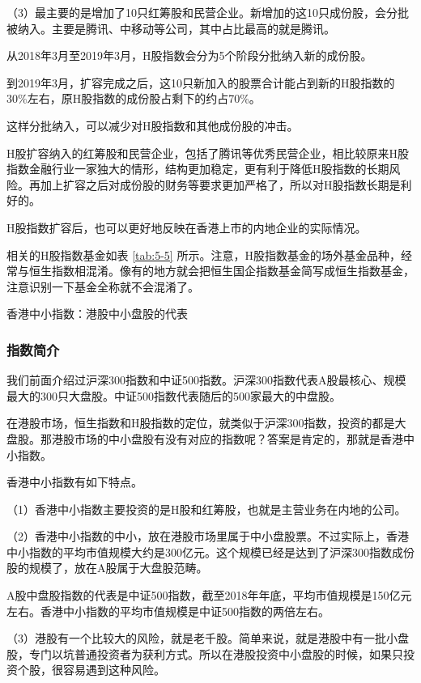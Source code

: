 （3）最主要的是增加了10只红筹股和民营企业。新增加的这10只成份股，会分批被纳入。主要是腾讯、中移动等公司，其中占比最高的就是腾讯。

从2018年3月至2019年3月，H股指数会分为5个阶段分批纳入新的成份股。

到2019年3月，扩容完成之后，这10只新加入的股票合计能占到新的H股指数的30\%左右，原H股指数的成份股占剩下的约占70\%。

这样分批纳入，可以减少对H股指数和其他成份股的冲击。

H股扩容纳入的红筹股和民营企业，包括了腾讯等优秀民营企业，相比较原来H股指数金融行业一家独大的情形，结构更加稳定，更有利于降低H股指数的长期风险。再加上扩容之后对成份股的财务等要求更加严格了，所以对H股指数长期是利好的。

H股指数扩容后，也可以更好地反映在香港上市的内地企业的实际情况。

相关的H股指数基金如表 \ref{tab:5-5} 所示。注意，H股指数基金的场外基金品种，经常与恒生指数相混淆。像有的地方就会把恒生国企指数基金简写成恒生指数基金，注意识别一下基金全称就不会混淆了。






{\fangsong 香港中小指数：港股中小盘股的代表}

\subsubsection{指数简介}

我们前面介绍过沪深300指数和中证500指数。沪深300指数代表A股最核心、规模最大的300只大盘股。中证500指数代表随后的500家最大的中盘股。

在港股市场，恒生指数和H股指数的定位，就类似于沪深300指数，投资的都是大盘股。那港股市场的中小盘股有没有对应的指数呢？答案是肯定的，那就是香港中小指数。

香港中小指数有如下特点。

（1）香港中小指数主要投资的是H股和红筹股，也就是主营业务在内地的公司。

（2）香港中小指数的中小，放在港股市场里属于中小盘股票。不过实际上，香港中小指数的平均市值规模大约是300亿元。这个规模已经是达到了沪深300指数成份股的规模了，放在A股属于大盘股范畴。

A股中盘股指数的代表是中证500指数，截至2018年年底，平均市值规模是150亿元左右。香港中小指数的平均市值规模是中证500指数的两倍左右。

（3）港股有一个比较大的风险，就是老千股。简单来说，就是港股中有一批小盘股，专门以坑普通投资者为获利方式。所以在港股投资中小盘股的时候，如果只投资个股，很容易遇到这种风险。

